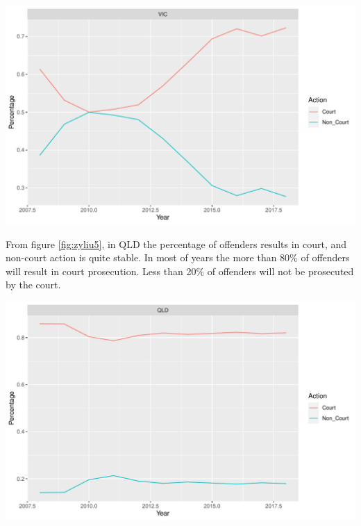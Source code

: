 \documentclass[11pt,a4paper,]{article}
\let\origfigure\figure
\let\endorigfigure\endfigure
\renewenvironment{figure}[1][2] {
\expandafter\origfigure\expandafter[H]
} {
\endorigfigure
}
\begin{document}
\begin{figure}

{\centering \includegraphics{ETC5513-Assignment4_files/figure-latex/zyliu4-1} 

}

\caption{Court actions of offenders in VIC}\label{fig:zyliu4}
\end{figure}

From figure \ref{fig:zyliu5}, in QLD the percentage of offenders results in court, and non-court action is quite stable. In most of years the more than 80\% of offenders will result in court prosecution. Less than 20\% of offenders will not be prosecuted by the court.

\begin{figure}

{\centering \includegraphics{ETC5513-Assignment4_files/figure-latex/zyliu5-1} 

}

\caption{Court actions of offenders in QLD}\label{fig:zyliu5}
\end{figure}
\end{document}
